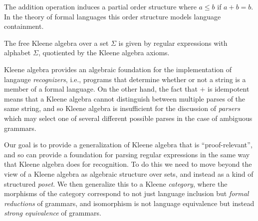 \documentclass[acmsmall,anonymous,review,screen]{acmart}
\begin{document}
The addition operation induces a partial order structure where $a \leq
b$ if $a + b = b$. In the theory of formal languages this order
structure models language containment.

\begin{example}
  The free Kleene algebra over a set $\Sigma$ is given by regular
  expressions with alphabet $\Sigma$, quotiented by the Kleene algebra
  axioms.
\end{example}

Kleene algebra provides an algebraic foundation for the implementation
of langauge \emph{recognizers}, i.e., programs that determine whether
or not a string is a member of a formal language. On the other hand,
the fact that $+$ is idempotent means that a Kleene algebra cannot
distinguish between multiple parses of the same string, and so Kleene
algebra is insufficient for the discussion of \emph{parsers} which may
select one of several different possible parses in the case of
ambiguous grammars.

Our goal is to provide a generalization of Kleene algebra that is
``proof-relevant'', and so can provide a foundation for parsing
regular expressions in the same way that Kleene algebra does for
recognition. To do this we need to move beyond the view of a Kleene
algebra as algebraic structure over sets, and instead as a kind of
structured \emph{poset}. We then generalize this to a Kleene
\emph{category}, where the morphisms of the category correspond to not
just language inclusion but \emph{formal reductions} of grammars, and
isomorphism is not language equivalence but instead \emph{strong
equivalence} of grammars.
\end{document}
